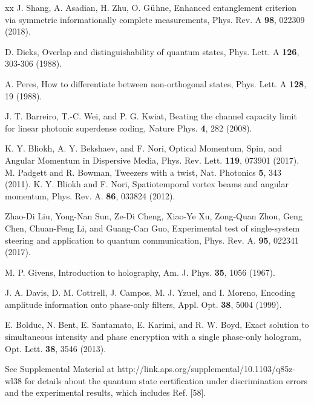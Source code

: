 \documentclass[letterpaper,preprint,superscriptaddress,floatfix,showpacs]{revtex4}
\begin{document}
\begin{thebibliography}{xx}
 J. Shang, A. Asadian, H. Zhu, O. G$\rm \ddot{u}$hne, Enhanced entanglement criterion via symmetric informationally complete measurements, Phys. Rev. A {\bf 98}, 022309 (2018).


 D. Dieks, Overlap and distinguishability of quantum states, Phys. Lett. A {\bf 126}, 303-306 (1988).




 A. Peres, How to differentiate between non-orthogonal states, Phys. Lett. A {\bf 128}, 19 (1988).



 J. T. Barreiro, T.-C. Wei, and P. G. Kwiat, Beating the channel capacity limit for linear photonic superdense coding, Nature Phys. {\bf 4}, 282 (2008).

 K. Y. Bliokh, A. Y. Bekshaev, and F. Nori, Optical Momentum, Spin, and Angular Momentum in Dispersive Media, Phys. Rev. Lett. {\bf 119}, 073901 (2017).
 M. Padgett and R. Bowman, Tweezers with a twist, Nat. Photonics {\bf 5}, 343 (2011).
 K. Y. Bliokh and F. Nori, Spatiotemporal vortex beams and angular momentum, Phys. Rev. A. {\bf 86}, 033824 (2012).



  Zhao-Di Liu, Yong-Nan Sun, Ze-Di Cheng, Xiao-Ye Xu, Zong-Quan Zhou, Geng Chen, Chuan-Feng Li, and Guang-Can Guo, Experimental test of single-system steering and application to quantum communication, Phys. Rev. A. {\bf 95}, 022341 (2017).



 M. P. Givens, Introduction to holography, Am. J. Phys. {\bf 35}, 1056 (1967).

 J. A. Davis, D. M. Cottrell, J. Campos, M. J. Yzuel, and I. Moreno, Encoding amplitude information onto phase-only filters, Appl. Opt. {\bf 38}, 5004 (1999).

 E. Bolduc, N. Bent, E. Santamato, E. Karimi, and R. W. Boyd, Exact solution to simultaneous intensity and phase encryption with a single phase-only hologram, Opt. Lett. {\bf 38}, 3546 (2013).






 See Supplemental Material at http://link.aps.org/supplemental/10.1103/q85z-wl38 for details about the quantum state certification under discrimination errors and the experimental results, which includes Ref. [58].





\end{thebibliography}
\end{document}

